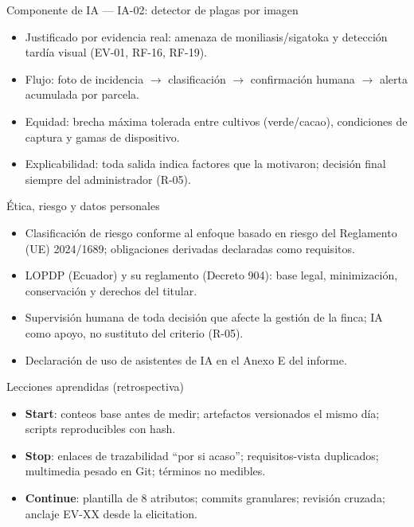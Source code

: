 \documentclass[12pt,aspectratio=169]{beamer}
\begin{document}
\begin{frame}{Componente de IA --- IA-02: detector de plagas por imagen}
  \begin{itemize}
    \item Justificado por evidencia real: amenaza de moniliasis/sigatoka y detecci\'on tard\'ia visual (EV-01, RF-16, RF-19).
    \item Flujo: foto de incidencia $\rightarrow$ clasificaci\'on $\rightarrow$ confirmaci\'on humana $\rightarrow$ alerta acumulada por parcela.
    \item Equidad: brecha m\'axima tolerada entre cultivos (verde/cacao), condiciones de captura y gamas de dispositivo.
    \item Explicabilidad: toda salida indica factores que la motivaron; decisi\'on final siempre del administrador (R-05).
  \end{itemize}
\end{frame}

\begin{frame}{\'Etica, riesgo y datos personales}
  \begin{itemize}
    \item Clasificaci\'on de riesgo conforme al enfoque basado en riesgo del Reglamento (UE) 2024/1689; obligaciones derivadas declaradas como requisitos.
    \item LOPDP (Ecuador) y su reglamento (Decreto 904): base legal, minimizaci\'on, conservaci\'on y derechos del titular.
    \item Supervisi\'on humana de toda decisi\'on que afecte la gesti\'on de la finca; IA como apoyo, no sustituto del criterio (R-05).
    \item Declaraci\'on de uso de asistentes de IA en el Anexo E del informe.
  \end{itemize}
\end{frame}

\begin{frame}{Lecciones aprendidas (retrospectiva)}
  \begin{itemize}
    \item \textbf{Start}: conteos base antes de medir; artefactos versionados el mismo d\'ia; scripts reproducibles con hash.
    \item \textbf{Stop}: enlaces de trazabilidad ``por si acaso''; requisitos-vista duplicados; multimedia pesado en Git; t\'erminos no medibles.
    \item \textbf{Continue}: plantilla de 8 atributos; commits granulares; revisi\'on cruzada; anclaje EV-XX desde la elicitation.
  \end{itemize}
\end{frame}
\end{document}

